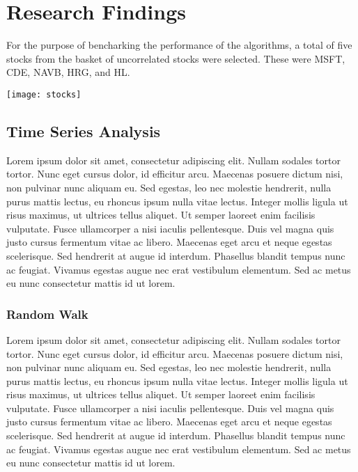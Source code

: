 \chapter{Research Findings}
For the purpose of bencharking the performance of the algorithms, a total of five stocks from the basket of uncorrelated stocks were selected. These were MSFT, CDE, NAVB, HRG, and HL. 

\texttt{[image: stocks]}

\section{Time Series Analysis}
Lorem ipsum dolor sit amet, consectetur adipiscing elit. Nullam sodales tortor tortor. Nunc eget cursus dolor, id efficitur arcu. Maecenas posuere dictum nisi, non pulvinar nunc aliquam eu. Sed egestas, leo nec molestie hendrerit, nulla purus mattis lectus, eu rhoncus ipsum nulla vitae lectus. Integer mollis ligula ut risus maximus, ut ultrices tellus aliquet. Ut semper laoreet enim facilisis vulputate. Fusce ullamcorper a nisi iaculis pellentesque. Duis vel magna quis justo cursus fermentum vitae ac libero. Maecenas eget arcu et neque egestas scelerisque. Sed hendrerit at augue id interdum. Phasellus blandit tempus nunc ac feugiat. Vivamus egestas augue nec erat vestibulum elementum. Sed ac metus eu nunc consectetur mattis id ut lorem.

\subsection{Random Walk}
Lorem ipsum dolor sit amet, consectetur adipiscing elit. Nullam sodales tortor tortor. Nunc eget cursus dolor, id efficitur arcu. Maecenas posuere dictum nisi, non pulvinar nunc aliquam eu. Sed egestas, leo nec molestie hendrerit, nulla purus mattis lectus, eu rhoncus ipsum nulla vitae lectus. Integer mollis ligula ut risus maximus, ut ultrices tellus aliquet. Ut semper laoreet enim facilisis vulputate. Fusce ullamcorper a nisi iaculis pellentesque. Duis vel magna quis justo cursus fermentum vitae ac libero. Maecenas eget arcu et neque egestas scelerisque. Sed hendrerit at augue id interdum. Phasellus blandit tempus nunc ac feugiat. Vivamus egestas augue nec erat vestibulum elementum. Sed ac metus eu nunc consectetur mattis id ut lorem.

